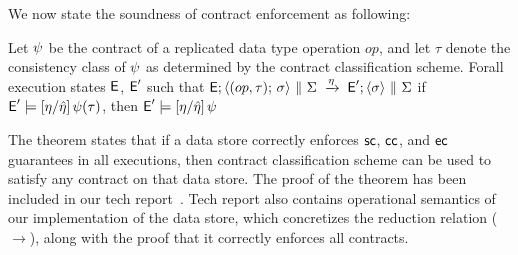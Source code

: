 

We now state the soundness of contract enforcement as following:

\begin{theorem}
\label{lem:core-preservation}
Let $\psi$ be the contract of a replicated data type operation $op$,
and let $\tau$ denote the consistency class of $\psi$
as determined by the contract classification scheme. Forall execution
states ${\normalfont \textsf{E}}$, ${\normalfont \textsf{E}}'$ such that
${\normalfont \textsf{E}};\langle (op,\tau);\,\sigma \rangle ~\|~ \Sigma \;\xrightarrow{\eta}\; {\normalfont \textsf{E}}';\langle \sigma \rangle ~\|~ \Sigma$
if ${\normalfont \textsf{E}}' \models [\eta/\hat{\eta}]\,\psi(\tau)$, then ${\normalfont \textsf{E}}' \models [\eta/\hat{\eta}]\,\psi$
\end{theorem}

The theorem states that if a data store correctly enforces ${\sf sc}$,
${\sf cc}$, and ${\sf ec}$ guarantees in all executions, then contract
classification scheme can be used to satisfy any \name contract on
that data store. The proof of the theorem has been included in our
tech report~\cite{techrep}. Tech report also contains operational
semantics of our implementation of the data store, which concretizes
the reduction relation ($\xrightarrow{}$), along with the proof
that it correctly enforces all \name contracts.
